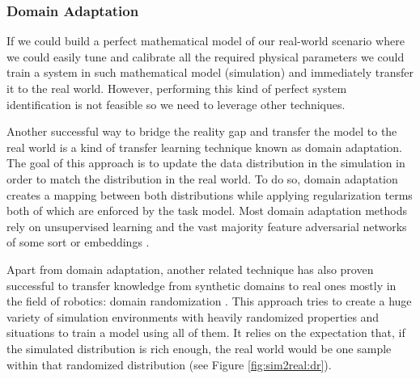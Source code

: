 \clearpage

\subsubsection{Domain Adaptation}

If we could build a perfect mathematical model of our real-world scenario where we could easily tune and calibrate all the required physical parameters we could train a system in such mathematical model (simulation) and immediately transfer it to the real world. However, performing this kind of perfect system identification is not feasible so we need to leverage other techniques.

Another successful way to bridge the reality gap and transfer the model to the real world is a kind of transfer learning technique known as domain adaptation. The goal of this approach is to update the data distribution in the simulation in order to match the distribution in the real world. To do so, domain adaptation creates a mapping between both distributions while applying regularization terms both of which are enforced by the task model. Most domain adaptation methods rely on unsupervised learning and the vast majority feature adversarial networks of some sort \cite{Pinheiro2018, Sankaranarayanan2018, Hong2018} or embeddings \cite{Murez2018} .

Apart from domain adaptation, another related technique has also proven successful to transfer knowledge from synthetic domains to real ones mostly in the field of robotics: domain randomization \cite{Tremblay2018}. This approach tries to create a huge variety of simulation environments with heavily randomized properties and situations to train a model using all of them. It relies on the expectation that, if the simulated distribution is rich enough, the real world would be one sample within that randomized distribution (see Figure \ref{fig:sim2real:dr}).

